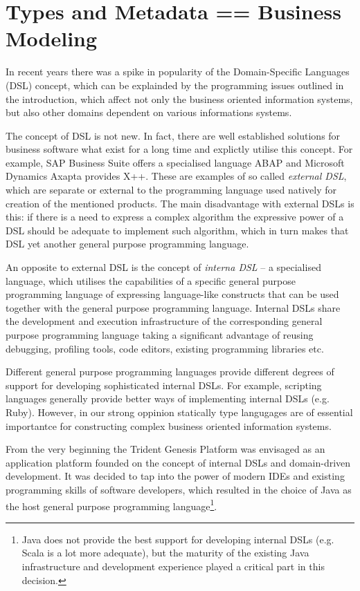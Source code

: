 \section{Types and Metadata == Business Modeling}\label{sec:02}

  In recent years there was a spike in popularity of the Domain-Specific Languages (DSL) concept, which can be explainded by the programming issues outlined in the introduction, which affect not only the business oriented information systems, but also other domains dependent on various informations systems.

  The concept of DSL is not new.
  In fact, there are well established solutions for business software what exist for a long time and explictly utilise this concept.
  For example, SAP Business Suite offers a specialised language ABAP and Microsoft Dynamics Axapta provides X++.
  These are examples of so called \emph{external DSL}, which are separate or external to the programming language used natively for creation of the mentioned products.
  The main disadvantage with external DSLs is this: if there is a need to express a complex algorithm the expressive power of a DSL should be adequate to implement such algorithm, which in turn makes that DSL yet another general purpose programming language.
  
  An opposite to external DSL is the concept of \emph{interna DSL} -- a specialised language, which utilises the capabilities of a specific general purpose programming language of expressing language-like constructs that can be used together with the general purpose programming language.
  Internal DSLs share the development and execution infrastructure of the corresponding general purpose programming language taking a significant advantage of reusing debugging, profiling tools, code editors, existing programming libraries etc.
  
  Different general purpose programming languages provide different degrees of support for developing sophisticated internal DSLs.
  For example, scripting languages generally provide better ways of implementing internal DSLs (e.g. Ruby).
  However, in our strong oppinion statically type langugages are of essential importantce for constructing complex business oriented information systems.
  
  From the very beginning the Trident Genesis Platform was envisaged as an application platform founded on the concept of internal DSLs and domain-driven development.
  It was decided to tap into the power of modern IDEs and existing programming skills of software developers, which resulted in the choice of Java as the host general purpose programming language\footnote{Java does not provide the best support for developing internal DSLs (e.g. Scala is a lot more adequate), but the maturity of the existing Java infrastructure and development experience played a critical part in this decision.}.

